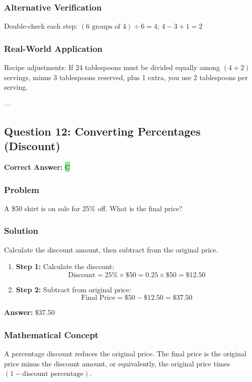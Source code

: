 \documentclass[12pt]{article}
\begin{document}
\subsubsection*{Alternative Verification}
Double-check each step: $(6 \text{ groups of } 4) \div 6 = 4$; $4 - 3 + 1 = 2$ 

\subsubsection*{Real-World Application}
Recipe adjustments: If 24 tablespoons must be divided equally among $(4 + 2)$ servings, minus 3 tablespoons reserved, plus 1 extra, you use 2 tablespoons per serving.

---

\subsection{Question 12: Converting Percentages (Discount)}

\textbf{Correct Answer: } \colorbox{lightgreen}{C}

\subsubsection*{Problem}
A \$50 shirt is on sale for 25\% off. What is the final price?

\subsubsection*{Solution}

Calculate the discount amount, then subtract from the original price.

\begin{enumerate}
\item \textbf{Step 1:} Calculate the discount:
  \[
  \text{Discount} = 25\% \times \$50 = 0.25 \times \$50 = \$12.50
  \]
\item \textbf{Step 2:} Subtract from original price:
  \[
  \text{Final Price} = \$50 - \$12.50 = \$37.50
  \]
\end{enumerate}

\textbf{Answer: } \$37.50

\subsubsection*{Mathematical Concept}
A percentage discount reduces the original price. The final price is the original price minus the discount amount, or equivalently, the original price times $(1 - \text{discount percentage})$.
\end{document}

